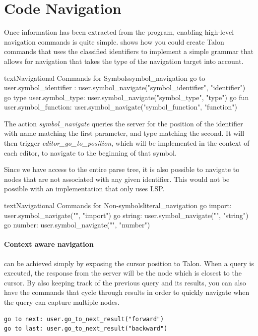 \documentclass[../thesis.tex]{subfiles}
\begin{document}
\section{Code Navigation}%
\label{sec:code_navigation}
Once information has been extracted from the program, enabling high-level navigation commands is quite simple.
 shows how you could create Talon commands that uses the classified identifiers
to implement a simple grammar that allows for navigation that takes the type of the navigation target
into account.
\begin{code}{text}{Navigational Commands for Symbols}{symbol_navigation}
go to { user.symbol_identifier }:
    user.symbol_navigate("{symbol_identifier}", "identifier")
go type {user.symbol_type}:
    user.symbol_navigate("{symbol_type}", "type")
go fun {user.symbol_function}:
    user.symbol_navigate("{symbol_function}", "function")
\end{code}
The action \textit{symbol\_navigate} queries the server
for the position of the identifier with name matching the first parameter, and type matching the second.
It will then trigger \textit{editor\_go\_to\_position}, which will be implemented in the context of each editor,
to navigate to the beginning of that symbol.

Since we have access to the entire parse tree, it is also possible to navigate to nodes that
are not associated with any given identifier.
This would not be possible with an implementation that only uses LSP.
\begin{code}{text}{Navigational Commands for Non-symbols}{literal_navigation}
go import: user.symbol_navigate("", "import")
go string: user.symbol_navigate("", "string")
go number: user.symbol_navigate("", "number")
\end{code}

\paragraph{Context aware navigation}
can be achieved simply by exposing the cursor position to Talon.
When a query is executed, the response from the server will be the node
which is closest to the cursor. By also keeping track of
the previous query and its results, you can also have
the commands that cycle through results in order to quickly navigate
when the query can capture multiple nodes.
\begin{verbatim}
go to next: user.go_to_next_result("forward")
go to last: user.go_to_next_result("backward")
\end{verbatim}
\end{document}
